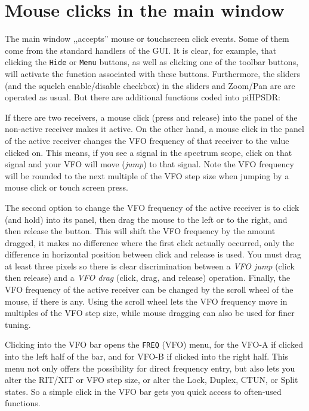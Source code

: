 \documentclass[12pt]{book}
\def\rett#1{\texttt{\color{red}#1}}
\def\bltt#1{\texttt{\color{blue}#1}}
\def\pH{pi\-HPSDR\xspace}
\begin{document}
\section{Mouse clicks in the main window}
The main window ,,accepts'' mouse or touchscreen click events.
Some of them come from the standard handlers of the GUI. It is
clear, for example, that clicking the \rett{Hide} or
\rett{Menu} buttons, as well as clicking one of the
toolbar buttons, will activate the function associated with
these buttons. Furthermore, the sliders (and the squelch enable/disable
checkbox) in the sliders and Zoom/Pan are are operated as usual.
But there are additional functions coded into \pH:

If there are two receivers, a mouse click (press and release) into
the panel of the non-active receiver makes it active. On the other
hand, a mouse click in the panel of the active receiver changes
the VFO frequency of that receiver to the value clicked on.
This means, if you see a signal in the spectrum scope, click
on that signal and your VFO will move (\textit{jump}) to that signal.
Note the VFO frequency will be  rounded to the next multiple of
the VFO step size when jumping by a mouse  click or
touch screen press.

The second option to change the VFO frequency of the active receiver
is to click (and hold) into its panel, then drag the mouse to the left
or to the right, and then release the button. This will shift the
VFO frequency by the amount dragged, it makes no difference
where the first click actually occurred, only the difference
in horizontal position between click and release is used. You must
drag at least three pixels so there is clear discrimination between
a \textit{VFO jump} (click then release) and a \textit{VFO drag} (click, drag,
and release) operation. Finally, the VFO frequency of the active
receiver can be changed by the scroll wheel of the mouse, if there
is any. Using the scroll wheel lets the VFO frequency move in multiples
of the VFO step size, while mouse dragging can also be used for
finer tuning.

Clicking into the VFO bar opens the \bltt{FREQ} (VFO) menu,
for the VFO-A if clicked into the left half of the bar, and for
VFO-B if clicked into the right half. This menu not only offers
the possibility for direct frequency entry, but also lets you
alter the RIT/XIT or VFO step size, or alter the Lock, Duplex,
CTUN, or Split states. So a simple click in the VFO bar
gets you quick access to often-used functions.
\end{document}
